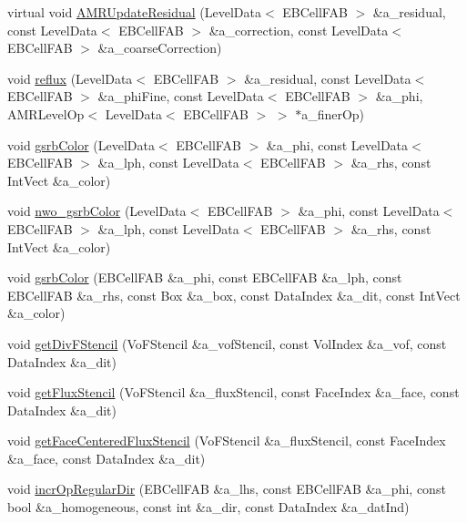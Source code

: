 \begin{DoxyCompactItemize}
\item 
virtual void \hyperlink{classebconductivityop_a394c3d9ca273ccc96fbf22c5a5bc94bf}{A\+M\+R\+Update\+Residual} (Level\+Data$<$ E\+B\+Cell\+F\+AB $>$ \&a\+\_\+residual, const Level\+Data$<$ E\+B\+Cell\+F\+AB $>$ \&a\+\_\+correction, const Level\+Data$<$ E\+B\+Cell\+F\+AB $>$ \&a\+\_\+coarse\+Correction)
\item 
void \hyperlink{classebconductivityop_a84b3d1beca12366789259d16d8c02e59}{reflux} (Level\+Data$<$ E\+B\+Cell\+F\+AB $>$ \&a\+\_\+residual, const Level\+Data$<$ E\+B\+Cell\+F\+AB $>$ \&a\+\_\+phi\+Fine, const Level\+Data$<$ E\+B\+Cell\+F\+AB $>$ \&a\+\_\+phi, A\+M\+R\+Level\+Op$<$ Level\+Data$<$ E\+B\+Cell\+F\+AB $>$ $>$ $\ast$a\+\_\+finer\+Op)
\item 
void \hyperlink{classebconductivityop_abbd2241964fb3810661141bb894e56e8}{gsrb\+Color} (Level\+Data$<$ E\+B\+Cell\+F\+AB $>$ \&a\+\_\+phi, const Level\+Data$<$ E\+B\+Cell\+F\+AB $>$ \&a\+\_\+lph, const Level\+Data$<$ E\+B\+Cell\+F\+AB $>$ \&a\+\_\+rhs, const Int\+Vect \&a\+\_\+color)
\item 
void \hyperlink{classebconductivityop_a7a80e409a299e27eb6ed70234a649216}{nwo\+\_\+gsrb\+Color} (Level\+Data$<$ E\+B\+Cell\+F\+AB $>$ \&a\+\_\+phi, const Level\+Data$<$ E\+B\+Cell\+F\+AB $>$ \&a\+\_\+lph, const Level\+Data$<$ E\+B\+Cell\+F\+AB $>$ \&a\+\_\+rhs, const Int\+Vect \&a\+\_\+color)
\item 
void \hyperlink{classebconductivityop_a90155c2e5571f116f82bc0aeb5dabc6e}{gsrb\+Color} (E\+B\+Cell\+F\+AB \&a\+\_\+phi, const E\+B\+Cell\+F\+AB \&a\+\_\+lph, const E\+B\+Cell\+F\+AB \&a\+\_\+rhs, const Box \&a\+\_\+box, const Data\+Index \&a\+\_\+dit, const Int\+Vect \&a\+\_\+color)
\item 
void \hyperlink{classebconductivityop_a54d10407947ae5cf78c85754ddf12946}{get\+Div\+F\+Stencil} (Vo\+F\+Stencil \&a\+\_\+vof\+Stencil, const Vol\+Index \&a\+\_\+vof, const Data\+Index \&a\+\_\+dit)
\item 
void \hyperlink{classebconductivityop_ac8e927fe8cf52ccdd2e8e2cf38c6ceb9}{get\+Flux\+Stencil} (Vo\+F\+Stencil \&a\+\_\+flux\+Stencil, const Face\+Index \&a\+\_\+face, const Data\+Index \&a\+\_\+dit)
\item 
void \hyperlink{classebconductivityop_a6ab71f2b04542cd565f136d3486a300d}{get\+Face\+Centered\+Flux\+Stencil} (Vo\+F\+Stencil \&a\+\_\+flux\+Stencil, const Face\+Index \&a\+\_\+face, const Data\+Index \&a\+\_\+dit)
\item 
void \hyperlink{classebconductivityop_af70ee0bcfe52b86c34331e5ee8c700b4}{incr\+Op\+Regular\+Dir} (E\+B\+Cell\+F\+AB \&a\+\_\+lhs, const E\+B\+Cell\+F\+AB \&a\+\_\+phi, const bool \&a\+\_\+homogeneous, const int \&a\+\_\+dir, const Data\+Index \&a\+\_\+dat\+Ind)

\end{DoxyCompactItemize}
